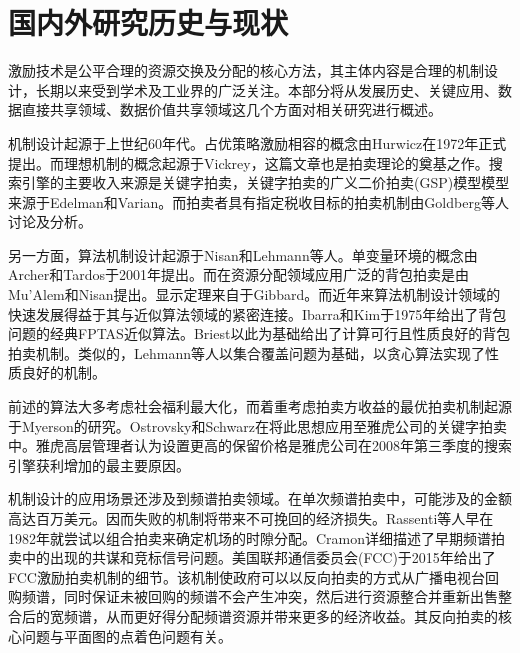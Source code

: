 \documentclass[promaster]{thesis-uestc}
\begin{document}
\section{国内外研究历史与现状}

激励技术是公平合理的资源交换及分配的核心方法，其主体内容是合理的机制设计，长期以来受到学术及工业界的广泛关注。本部分将从发展历史、关键应用、数据直接共享领域、数据价值共享领域这几个方面对相关研究进行概述。

机制设计起源于上世纪60年代。占优策略激励相容的概念由Hurwicz在1972年正式提出。而理想机制的概念起源于Vickrey，这篇文章也是拍卖理论的奠基之作。搜索引擎的主要收入来源是关键字拍卖，关键字拍卖的广义二价拍卖(GSP)模型模型来源于Edelman和Varian。而拍卖者具有指定税收目标的拍卖机制由Goldberg等人讨论及分析。

另一方面，算法机制设计起源于Nisan和Lehmann等人。单变量环境的概念由Archer和Tardos于2001年提出。而在资源分配领域应用广泛的背包拍卖是由Mu'Alem和Nisan提出。显示定理来自于Gibbard。而近年来算法机制设计领域的快速发展得益于其与近似算法领域的紧密连接。Ibarra和Kim于1975年给出了背包问题的经典FPTAS近似算法。Briest以此为基础给出了计算可行且性质良好的背包拍卖机制。类似的，Lehmann等人以集合覆盖问题为基础，以贪心算法实现了性质良好的机制。

前述的算法大多考虑社会福利最大化，而着重考虑拍卖方收益的最优拍卖机制起源于Myerson的研究。Ostrovsky和Schwarz在将此思想应用至雅虎公司的关键字拍卖中。雅虎高层管理者认为设置更高的保留价格是雅虎公司在2008年第三季度的搜索引擎获利增加的最主要原因。

机制设计的应用场景还涉及到频谱拍卖领域\cite{gao2010map}\cite{wang2011district}\cite{yang2014promise}\cite{zhou2008ebay}。在单次频谱拍卖中，可能涉及的金额高达百万美元。因而失败的机制将带来不可挽回的经济损失。Rassenti等人早在1982年就尝试以组合拍卖来确定机场的时隙分配。Cramon详细描述了早期频谱拍卖中的出现的共谋和竞标信号问题。美国联邦通信委员会(FCC)于2015年给出了FCC激励拍卖机制的细节。该机制使政府可以以反向拍卖的方式从广播电视台回购频谱，同时保证未被回购的频谱不会产生冲突，然后进行资源整合并重新出售整合后的宽频谱，从而更好得分配频谱资源并带来更多的经济收益。其反向拍卖的核心问题与平面图的点着色问题有关。
\end{document}
